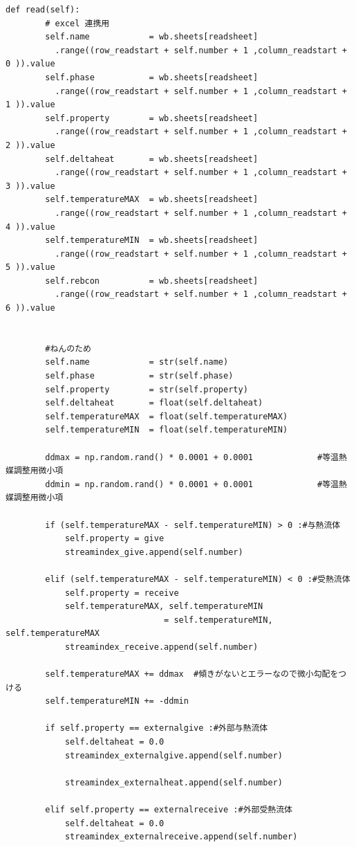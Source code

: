 \documentclass[a4j]{jsreport}
\begin{document}
\begin{lstlisting}[caption=グランドコンポジットカーブおよびTQ線図を書くコード]
    def read(self):
        # excel 連携用
        self.name            = wb.sheets[readsheet]
          .range((row_readstart + self.number + 1 ,column_readstart + 0 )).value
        self.phase           = wb.sheets[readsheet]
          .range((row_readstart + self.number + 1 ,column_readstart + 1 )).value
        self.property        = wb.sheets[readsheet]
          .range((row_readstart + self.number + 1 ,column_readstart + 2 )).value
        self.deltaheat       = wb.sheets[readsheet]
          .range((row_readstart + self.number + 1 ,column_readstart + 3 )).value
        self.temperatureMAX  = wb.sheets[readsheet]
          .range((row_readstart + self.number + 1 ,column_readstart + 4 )).value
        self.temperatureMIN  = wb.sheets[readsheet]
          .range((row_readstart + self.number + 1 ,column_readstart + 5 )).value
        self.rebcon          = wb.sheets[readsheet]
          .range((row_readstart + self.number + 1 ,column_readstart + 6 )).value


        #ねんのため
        self.name            = str(self.name)
        self.phase           = str(self.phase)
        self.property        = str(self.property)
        self.deltaheat       = float(self.deltaheat)
        self.temperatureMAX  = float(self.temperatureMAX)
        self.temperatureMIN  = float(self.temperatureMIN)

        ddmax = np.random.rand() * 0.0001 + 0.0001             #等温熱媒調整用微小項
        ddmin = np.random.rand() * 0.0001 + 0.0001             #等温熱媒調整用微小項

        if (self.temperatureMAX - self.temperatureMIN) > 0 :#与熱流体
            self.property = give
            streamindex_give.append(self.number)

        elif (self.temperatureMAX - self.temperatureMIN) < 0 :#受熱流体
            self.property = receive
            self.temperatureMAX, self.temperatureMIN
                                = self.temperatureMIN, self.temperatureMAX
            streamindex_receive.append(self.number)

        self.temperatureMAX += ddmax  #傾きがないとエラーなので微小勾配をつける
        self.temperatureMIN += -ddmin

        if self.property == externalgive :#外部与熱流体
            self.deltaheat = 0.0
            streamindex_externalgive.append(self.number)

            streamindex_externalheat.append(self.number)

        elif self.property == externalreceive :#外部受熱流体
            self.deltaheat = 0.0
            streamindex_externalreceive.append(self.number)


\end{lstlisting}
\end{document}
